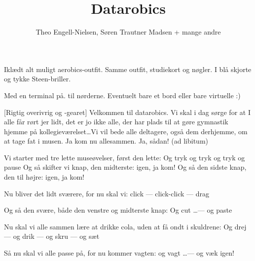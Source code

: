 \documentclass[10pt]{article}
\title{Datarobics}
\author{Theo Engell-Nielsen, Søren Trautner Madsen + mange andre}
\begin{document}
\maketitle

\begin{sketch}

\begin{roles}
   Iklædt alt muligt aerobics-outfit.
   Samme outfit, studiekort og nøgler.
   I blå skjorte og tykke Steen-briller.
\end{roles}

\begin{props}
   Med en terminal på.
   til nørderne.
   Eventuelt bare et bord eller bare virtuelle :) 
\end{props}


[Rigtig overivrig og -gearet] Velkommen til datarobics. Vi
skal i dag sørge for at I alle får rørt jer lidt, det er jo ikke alle, der
har plads til at gøre gymnastik hjemme på kollegieværelset\ldots Vi
vil bede alle deltagere, også dem derhjemme, om at tage fat i musen. Ja kom nu
allesammen. Ja, sådan! (ad libitum) 

 Vi starter med tre lette museøvelser, først den lette: Og tryk og tryk og tryk og pause
 Og så skifter vi knap, den midterste: igen, ja kom!
 Og så den sidste knap, den til højre: igen, ja kom!

 Nu bliver det lidt sværere, for nu skal vi: click --- click-click --- drag

 Og så den svære, både den venstre og midterste knap: Og cut \ldots --- og paste

 Nu skal vi alle sammen lære at drikke cola, uden at få
ondt i skuldrene: Og drej --- og drik --- og skru --- og sæt

 Så nu skal vi alle passe på, for nu kommer vagten: og vagt \ldots --- og væk igen!


\end{sketch}
\end{document}
